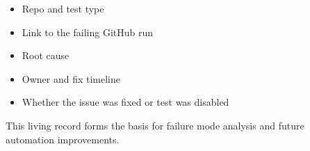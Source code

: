 \begin{itemize}
  \item Repo and test type

  \item Link to the failing GitHub run

  \item Root cause

  \item Owner and fix timeline

  \item Whether the issue was fixed or test was disabled
\end{itemize}

This living record forms the basis for failure mode analysis and future automation
improvements.
